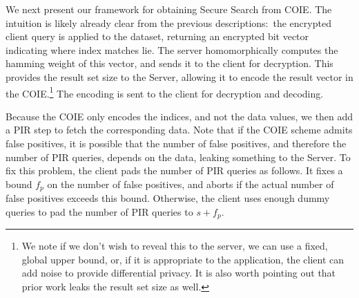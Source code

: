 We next present our framework for obtaining Secure Search from COIE.  
The intuition is likely already clear from the previous descriptions:~the encrypted client query is applied 
to the dataset, returning an encrypted bit vector indicating where index matches lie.  The server homomorphically computes the 
hamming weight of this vector, and sends it to the client for decryption. This provides the result set size to the Server, allowing it to encode the result vector in the COIE.\footnote{We note if we don't wish to reveal this to the server, we can use a fixed, global upper bound, or, if it is appropriate to the application, the client can add noise to provide differential privacy.  It is also worth pointing out that prior work leaks the result set size as well.}  The encoding is sent to the client for decryption and decoding.  

Because the COIE only encodes the indices, and not the data values, we 
then add a PIR step to fetch the corresponding data.  Note that if 
the COIE scheme admits false positives, it is possible that the number of false positives, and therefore the number of PIR queries, depends on the data, 
leaking something to the Server.  To fix this problem, the client pads the number of PIR queries as follows.  It 
fixes a bound $f_p$ on the number of false positives, and aborts if the actual number of false positives exceeds this bound.  Otherwise, the client uses enough dummy queries to pad the number of PIR queries to $s+ f_p$. 

